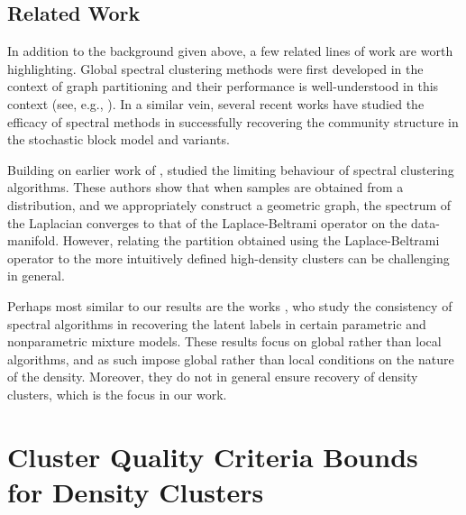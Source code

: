 \documentclass{article}
\newcommand{\1}{\mathbf{1}}
\theoremstyle{aldenthm}
\theoremstyle{aldenrmrk}
\begin{document}
\subsection{Related Work}

In addition to the background given above, a few related lines of work are worth
highlighting.
Global spectral clustering methods were first developed in the
context of graph partitioning \citep{fiedler1973,donath1973} and their
performance is well-understood in this context (see, e.g.,
\citep{tolliver2006,luxburg2007}).  In a similar vein, several recent works
\citep{mcsherry2001,rohe2011,kamalika2012,balakrishnan2011,lei2015,abbe2018} 
have studied the efficacy of spectral methods in successfully recovering the
community structure in the stochastic block model and variants.

Building on earlier work of
\citep{koltchinskii2000}, \citep{vonluxburg2008,hein2005} studied the limiting behaviour of spectral clustering
algorithms. These authors show that when samples are obtained from a
distribution, and we appropriately construct a geometric graph, the spectrum of
the Laplacian converges to that of the Laplace-Beltrami operator on the
data-manifold. However, relating the partition obtained using the
Laplace-Beltrami operator to the more intuitively defined high-density
clusters can be challenging in general.



Perhaps most similar to our results are the works
\citep{vempala2004,shi2009,schiebinger2015}, who study the consistency of
spectral algorithms in recovering the latent labels in certain parametric and
nonparametric mixture models. These results focus on global rather than local
algorithms, and as such impose global rather than local conditions on the nature
of the density. Moreover, they do not in general ensure recovery of density
clusters, which is the focus in our work. 

\section{Cluster Quality Criteria Bounds for Density Clusters}  
\label{sec: cluster_quality_bounds}
\end{document}
